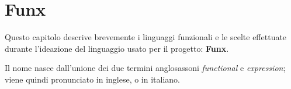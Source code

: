 \chapter{Funx}
\label{chap:2-funx}

Questo capitolo descrive brevemente i linguaggi funzionali e le scelte effettuate
durante l'ideazione del linguaggio usato per il progetto: \textbf{Funx}.

\noindent Il nome nasce dall'unione dei due termini anglosassoni \textit{functional} e \textit{expression};
viene quindi pronunciato \textipa{["f2nIk"s]} in inglese,
 o  in italiano.



\newpage

